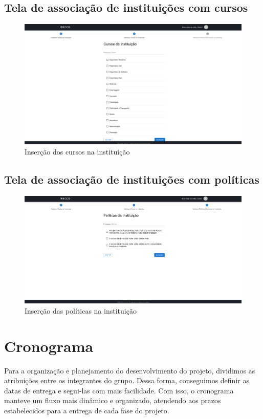\begin{apendicesenv}
\section{Tela de associação de instituições com cursos}
\begin{figure}[H]
    \centering
    \includegraphics[width=1.0\linewidth]{images/cursos.png}
    \caption{Inserção dos cursos na instituição}
    \label{fig:cursos}
\end{figure}

\section{Tela de associação de instituições com políticas}
\begin{figure}[H]
    \centering
    \includegraphics[width=1.0\linewidth]{images/politicas.png}
    \caption{Inserção das políticas na instituição}
    \label{fig:politicas}
\end{figure}

\chapter{Cronograma}
\label{apendice_i}
Para a organização e planejamento do desenvolvimento do projeto, dividimos as atribuições entre os integrantes do grupo. Dessa forma, conseguimos definir as datas de entrega e segui-las com mais facilidade. Com isso, o cronograma manteve um fluxo mais dinâmico e organizado, atendendo aos prazos estabelecidos para a entrega de cada fase do projeto.

\end{apendicesenv}
